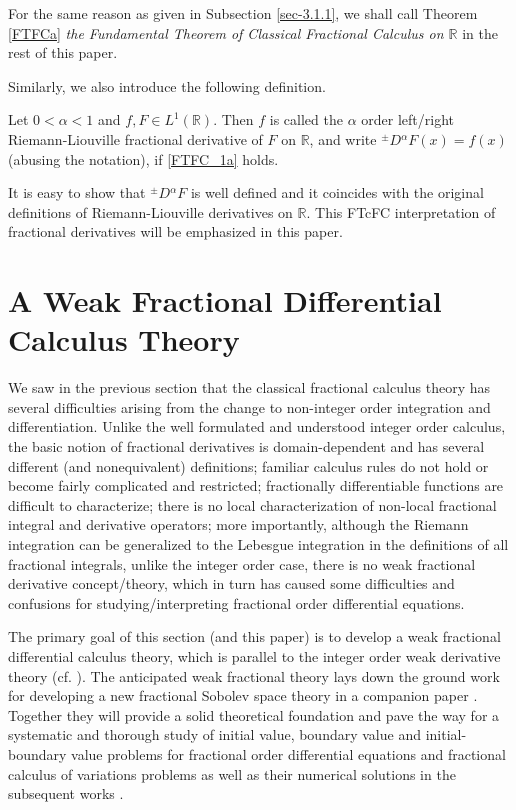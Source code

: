 \documentclass[leqno,final]{siamltex}
\numberwithin{equation}{section}
\renewcommand{\(}{\bigl(}
\renewcommand{\)}{\bigr)}
\newcommand{\R}{\mathbb{R}}
\begin{document}
For the same reason as given in Subsection \ref{sec-3.1.1}, we shall call 
Theorem \ref{FTFCa} {\em the Fundamental Theorem of Classical Fractional Calculus on $\R$}
in the rest of this paper. 

Similarly, we also introduce the following definition.

  \begin{definition} \label{FTFC_defa} 
	Let $0<\alpha <1$ and $f , F\in L^{1}(\R)$. Then $f$ is called  the $\alpha$ order left/right  
	Riemann-Liouville fractional derivative of $F$ on $\R$, and write ${^{\pm}}{D}{^{\alpha}}F(x) 
	= f(x)$ (abusing the notation), if \eqref{FTFC_1a} holds.  
\end{definition} 

It is easy to show that ${^{\pm}}{D}{^{\alpha}}F$ is well defined and it coincides with 
the original definitions of Riemann-Liouville derivatives on $\R$. 
This FTcFC interpretation of fractional derivatives will be emphasized in this paper.

 
\section{A Weak Fractional Differential Calculus Theory}\label{sec-4}
We saw in the previous section that the classical fractional calculus 
theory has several difficulties arising from the change to non-integer order 
integration and differentiation. Unlike the well formulated and understood 
integer order calculus, the basic notion of fractional derivatives is 
domain-dependent and has several different (and nonequivalent) 
definitions; familiar calculus rules do not hold or become fairly complicated 
and restricted; fractionally differentiable functions are difficult to characterize;  
there is no local characterization of non-local fractional integral and 
derivative operators; more importantly, although the Riemann integration 
can be generalized to the Lebesgue integration in the definitions of all 
fractional integrals, unlike the integer order case, there is no weak 
fractional derivative concept/theory, 
which in turn has caused some difficulties and confusions for studying/interpreting 
fractional order differential equations. 


The primary goal of this section (and this paper) is to develop a weak fractional 
differential calculus theory, which is parallel to the integer order weak derivative theory 
(cf. \cite{Adams, Brezis, Evans}). The anticipated weak fractional theory 
lays down the ground work for developing a new fractional Sobolev space theory
in a companion paper \cite{Feng_Sutton1a}. Together they will provide a solid theoretical 
foundation and  pave the way for a systematic and thorough study of initial value, 
boundary value and initial-boundary value problems for fractional order differential 
equations and fractional calculus of variations problems as well as 
their numerical solutions in the subsequent works \cite{Feng_Sutton2,Feng_Sutton3}. 
\end{document}
